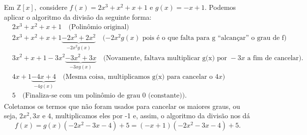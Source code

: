 \documentclass[AlgebraII/algebraII_notes.tex]{subfiles}
\begin{document}
\begin{example}
	Em \(\mathbb{Z}[x],\) considere \(f(x) = 2x^{3} + x^{2} + x + 1\)  e \(g(x) = -x + 1.\)
	Podemos aplicar o algoritmo da divisão da seguinte forma:
	\begin{align*}
		 & 2x^{3} + x^{2} + x + 1\quad \text{(Polinômio original)}                                                                                             \\
		 & 2x^{3} + x^{2} + x + 1 \underbrace{- 2x^{3} + 2x^{2}}_{-2x^{2}g(x)} \quad (-2x^{2}g(x)\text{ pois é o que falta para g ``alcançar'' o grau de f)}   \\
		 & 3x^{2} + x + 1 - 3x^{2} \underbrace{- 3x^{2} + 3x}_{-3xg(x)} \quad (\text{Novamente, faltava multiplicar g(x) por } -3x \text{ a fim de cancelar).} \\
		 & 4x + 1 \underbrace{- 4x + 4}_{-4g(x)} \quad\text{(Mesma coisa, multiplicamos g(x) para cancelar o } 4x)                                             \\
		 & 5\quad\text{(Finaliza-se com um polinômio de grau 0 (constante)).}
	\end{align*}
	Coletamos os termos que não foram usados para cancelar os maiores graus, ou seja, \(2x^{2}, 3x\) e \(4\), multiplicamos eles por -1 e, assim, o algoritmo da divisão nos dá
	\[
		f(x) = g(x)(-2x^{2} -3x -4) + 5 = (-x+1)(-2x^{2}-3x-4)+5.
	\]
\end{example}
\end{document}

